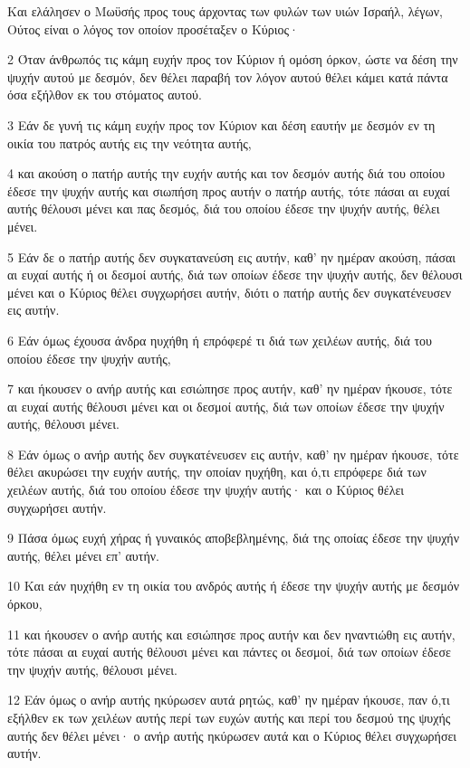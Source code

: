 \par Και ελάλησεν ο Μωϋσής προς τους άρχοντας των φυλών των υιών Ισραήλ, λέγων, Ούτος είναι ο λόγος τον οποίον προσέταξεν ο Κύριος·
\par 2 Όταν άνθρωπός τις κάμη ευχήν προς τον Κύριον ή ομόση όρκον, ώστε να δέση την ψυχήν αυτού με δεσμόν, δεν θέλει παραβή τον λόγον αυτού θέλει κάμει κατά πάντα όσα εξήλθον εκ του στόματος αυτού.
\par 3 Εάν δε γυνή τις κάμη ευχήν προς τον Κύριον και δέση εαυτήν με δεσμόν εν τη οικία του πατρός αυτής εις την νεότητα αυτής,
\par 4 και ακούση ο πατήρ αυτής την ευχήν αυτής και τον δεσμόν αυτής διά του οποίου έδεσε την ψυχήν αυτής και σιωπήση προς αυτήν ο πατήρ αυτής, τότε πάσαι αι ευχαί αυτής θέλουσι μένει και πας δεσμός, διά του οποίου έδεσε την ψυχήν αυτής, θέλει μένει.
\par 5 Εάν δε ο πατήρ αυτής δεν συγκατανεύση εις αυτήν, καθ' ην ημέραν ακούση, πάσαι αι ευχαί αυτής ή οι δεσμοί αυτής, διά των οποίων έδεσε την ψυχήν αυτής, δεν θέλουσι μένει και ο Κύριος θέλει συγχωρήσει αυτήν, διότι ο πατήρ αυτής δεν συγκατένευσεν εις αυτήν.
\par 6 Εάν όμως έχουσα άνδρα ηυχήθη ή επρόφερέ τι διά των χειλέων αυτής, διά του οποίου έδεσε την ψυχήν αυτής,
\par 7 και ήκουσεν ο ανήρ αυτής και εσιώπησε προς αυτήν, καθ' ην ημέραν ήκουσε, τότε αι ευχαί αυτής θέλουσι μένει και οι δεσμοί αυτής, διά των οποίων έδεσε την ψυχήν αυτής, θέλουσι μένει.
\par 8 Εάν όμως ο ανήρ αυτής δεν συγκατένευσεν εις αυτήν, καθ' ην ημέραν ήκουσε, τότε θέλει ακυρώσει την ευχήν αυτής, την οποίαν ηυχήθη, και ό,τι επρόφερε διά των χειλέων αυτής, διά του οποίου έδεσε την ψυχήν αυτής· και ο Κύριος θέλει συγχωρήσει αυτήν.
\par 9 Πάσα όμως ευχή χήρας ή γυναικός αποβεβλημένης, διά της οποίας έδεσε την ψυχήν αυτής, θέλει μένει επ' αυτήν.
\par 10 Και εάν ηυχήθη εν τη οικία του ανδρός αυτής ή έδεσε την ψυχήν αυτής με δεσμόν όρκου,
\par 11 και ήκουσεν ο ανήρ αυτής και εσιώπησε προς αυτήν και δεν ηναντιώθη εις αυτήν, τότε πάσαι αι ευχαί αυτής θέλουσι μένει και πάντες οι δεσμοί, διά των οποίων έδεσε την ψυχήν αυτής, θέλουσι μένει.
\par 12 Εάν όμως ο ανήρ αυτής ηκύρωσεν αυτά ρητώς, καθ' ην ημέραν ήκουσε, παν ό,τι εξήλθεν εκ των χειλέων αυτής περί των ευχών αυτής και περί του δεσμού της ψυχής αυτής δεν θέλει μένει· ο ανήρ αυτής ηκύρωσεν αυτά και ο Κύριος θέλει συγχωρήσει αυτήν.
